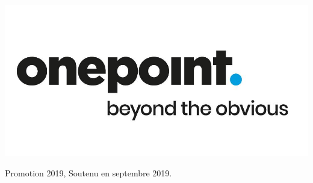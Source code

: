 \begin{titlepage}
\includegraphics[scale=0.15]{img/onepoint.jpg}\\[1cm]

\immediate{}

\begin{flushright} \large 
	Promotion 2019, Soutenu en septembre 2019.
	
	{\footnotesize }
\end{flushright}

\vfill %

\end{titlepage}